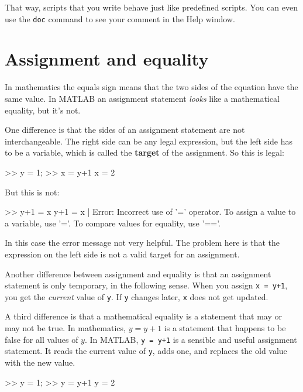 \documentclass[
]{book}
\numberwithin{Answer}{chapter}
\numberwithin{Exercise}{chapter}
\begin{document}
That way, scripts that you write behave just like predefined scripts.
You can even use the {\tt doc} command to see your comment in the
{\sf Help} window.




\section{Assignment and equality}


In mathematics the equals sign means that the two sides of the
equation have the same value.  In MATLAB an assignment statement
{\em looks} like a mathematical equality, but it's not.

One difference is that the sides of an assignment statement are not
interchangeable.  The right side can be any legal expression, but
the left side has to be a variable, which is called the 
{\bf target} of the assignment.  So this is legal:

\begin{code}
>> y = 1;
>> x = y+1
x = 2
\end{code}

But this is not:

\begin{code}
>> y+1 = x
 y+1 = x
     |
Error: Incorrect use of '=' operator. 
To assign a value to a variable, use '='. 
To compare values for equality, use '=='.
\end{code}

In this case the error message not very helpful.  The problem here is that the expression on the left side is not a valid target for an assignment.

Another difference between assignment and equality is that an assignment statement is only temporary, in the following sense.
When you assign {\tt x = y+1}, you get the
{\em current} value of {\tt y}.  If {\tt y} changes later, {\tt x}
does not get updated.

A third difference is that a mathematical equality is a statement that
may or may not be true.  In mathematics, $y = y+1$ is a statement that
happens to be false for all values of $y$.  
In MATLAB, {\tt y = y+1} is a sensible and useful assignment statement.
It reads the current value of {\tt y}, adds one, and replaces the old value with the new value.

\begin{code}
>> y = 1;
>> y = y+1
y = 2
\end{code}
\end{document}
